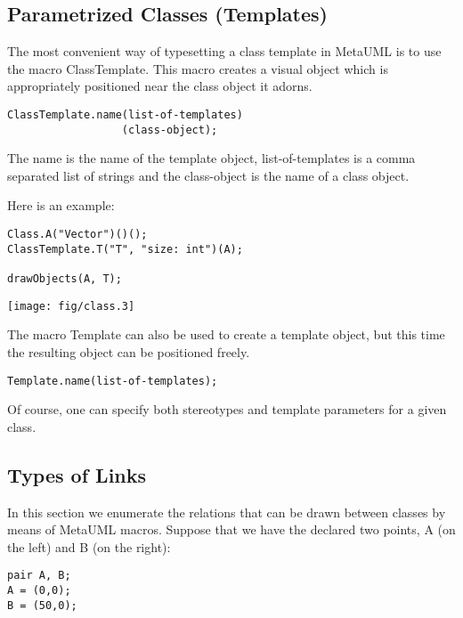\documentclass{article}
\newcommand{\code}{\ttfamily}
\begin{document}
\subsection{Parametrized Classes (Templates)}

The most convenient way of typesetting a class template in MetaUML is to use the macro {\code ClassTemplate}.
This macro creates a visual object which is appropriately positioned near the class object it adorns.

\begin{verbatim}
ClassTemplate.name(list-of-templates)
                  (class-object);
\end{verbatim}

The {\code name} is the name of the template object, {\code list-of-templates} is a comma separated list of strings and the {\code class-object} is the name of a class object.

Here is an example:

\begin{multicols}{2}
\begin{verbatim}
Class.A("Vector")()();
ClassTemplate.T("T", "size: int")(A);

drawObjects(A, T);
\end{verbatim}
\columnbreak
\hspace{1cm}\texttt{[image: fig/class.3]}
\end{multicols}

The macro {\code Template} can also be used to create a template object, but this time the resulting
object can be positioned freely.

\begin{verbatim}
Template.name(list-of-templates);
\end{verbatim}

Of course, one can specify both stereotypes and template parameters for a given class.

\subsection{Types of Links}

In this section we enumerate the relations that can be drawn between classes by means
of MetaUML macros. Suppose that we have the declared two points, {\code A} (on the left)
and {\code B} (on the right):

\begin{verbatim}
pair A, B;
A = (0,0);
B = (50,0);
\end{verbatim}
\end{document}
